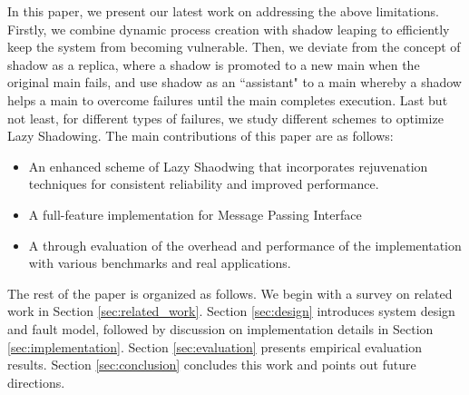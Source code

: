 In this paper, we present our latest work on addressing the above limitations. Firstly, we combine dynamic process creation with shadow leaping to efficiently keep the system from becoming vulnerable. Then, we deviate from the concept of shadow as a replica, where a shadow is promoted to a new main when the original main fails, and use shadow as an ``assistant" to a main whereby a shadow helps a main to overcome failures until the main completes execution. Last but not least, for different types of failures, we study different schemes to optimize Lazy Shadowing. The main contributions of this paper are as follows:

\begin{itemize}
\item An enhanced scheme of Lazy Shaodwing that incorporates rejuvenation techniques for consistent reliability and improved performance.
\item A full-feature implementation for Message Passing Interface
\item A through evaluation of the overhead and performance of the implementation with various benchmarks and real applications.
\end{itemize}

The rest of the paper is organized as follows. We begin with a survey on related work in Section 
\ref{sec:related_work}. Section \ref{sec:design} introduces system design and fault model, followed by discussion on implementation details in Section \ref{sec:implementation}.
Section \ref{sec:evaluation} presents empirical evaluation results. Section \ref{sec:conclusion} concludes this work and points out future directions.




